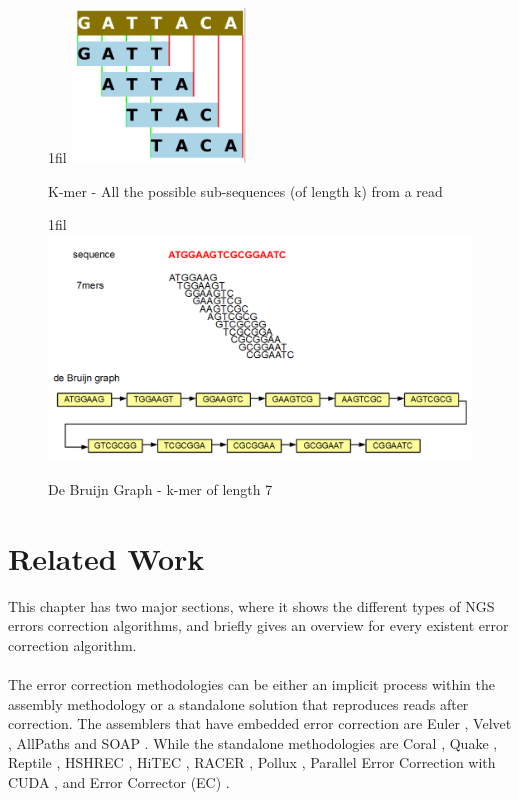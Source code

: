 \documentclass[12pt,openany]{llncs}
\makeatletter
\newcommand*{\centerfloat}{%
  \parindent \z@
  \leftskip \z@ \@plus 1fil \@minus \textwidth
  \rightskip\leftskip
  \parfillskip \z@skip}
\makeatother
\begin{document}
\newpage
\begin{figure}
	\centerfloat
	\includegraphics[width=.3\linewidth]{./figs/CrrConcepts-1}
	\caption{\label{fig:fig-CrrConcepts-1}{K-mer} - All the possible sub-sequences (of length k) from a read}
\end{figure}
\vspace{2cm}
\begin{figure}
	\centerfloat
	\includegraphics[width=1\linewidth]{./figs/CrrConcepts-2}
	\caption{\label{fig:fig-CrrConcepts-2}{De Bruijn Graph} - k-mer of length 7}
\end{figure}
%

\newpage
\chapter{\label{chap:3}Related Work}
This chapter has two major sections, where it shows the different types of NGS errors correction algorithms, and briefly gives an overview for every existent error correction algorithm.
\\
\\
The error correction methodologies can be either an implicit process within the assembly methodology or a standalone solution that reproduces reads after correction. The assemblers that have embedded error correction are Euler \cite{Euler}, Velvet \cite{Velvet}, AllPaths \cite{AllPaths} and SOAP \cite{Soap}. While the standalone methodologies are Coral \cite{Coral}, Quake \cite{Quake}, Reptile \cite{Reptile}, HSHREC \cite{HShrec}, HiTEC \cite{HiTec}, RACER \cite{Racer}, Pollux \cite{Pollux}, Parallel Error Correction with CUDA \cite{Cuda}, and Error Corrector (EC) \cite{EC}.
\end{document}
